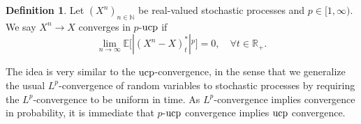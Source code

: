 \documentclass[11pt,a4paper,twoside,openany]{report}
\numberwithin{equation}{section}
\theoremstyle{plain} %
\theoremstyle{definition} %
\newtheorem{definition}[theorem]{Definition}
\theoremstyle{remark} %
\begin{document}
\begin{definition}\label{def:p-UCP convergence}
    Let \((X^n)_{n\in\mathbb{N}}\) be real-valued stochastic processes and \(p\in[1,\infty)\). We say \(X^n\to X\) converges in \(p\)-\(\rm{ucp}\) if 
    \begin{equation*}
        \lim_{n\to\infty}\mathbb{E}\big[|(X^n-X)^*_t|{^p}\big]=0,\quad\forall t\in\mathbb{R}_+.
    \end{equation*} 
\end{definition}
The idea is very similar to the \(\rm{ucp}\)-convergence, in the sense that we generalize the usual \(L^p\)-convergence of random variables to stochastic processes by requiring the \(L^p\)-convergence to be uniform in time. As \(L^p\)-convergence implies convergence in probability, it is immediate that \(p\)-\(\rm{ucp}\) convergence implies \(\rm{ucp}\) convergence. 
\end{document}

